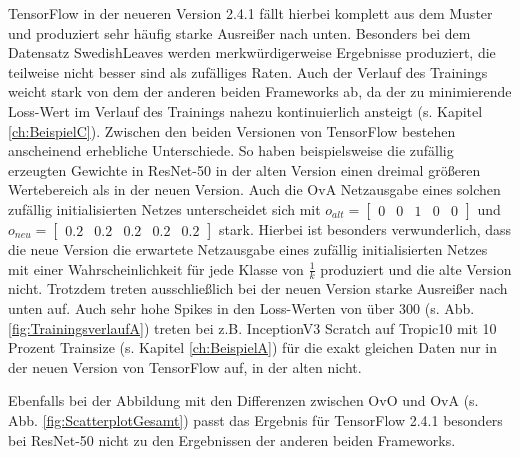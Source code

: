 TensorFlow \cite{tensorflow} in der neueren Version 2.4.1 fällt hierbei komplett aus dem Muster und produziert sehr häufig starke Ausreißer nach unten. Besonders bei dem Datensatz SwedishLeaves \cite{swedishLeaves} werden merkwürdigerweise Ergebnisse produziert, die teilweise nicht besser sind als zufälliges Raten. Auch der Verlauf des Trainings weicht stark von dem der anderen beiden Frameworks ab, da der zu minimierende Loss-Wert im Verlauf des Trainings nahezu kontinuierlich ansteigt (s. Kapitel \ref{ch:BeispielC}).
Zwischen den beiden Versionen von TensorFlow \cite{tensorflow} bestehen anscheinend erhebliche Unterschiede. So haben beispielsweise die zufällig erzeugten Gewichte in ResNet-50 in der alten Version einen dreimal größeren Wertebereich als in der neuen Version. Auch die OvA Netzausgabe eines solchen zufällig initialisierten Netzes unterscheidet sich mit $o_{alt}=\begin{bmatrix}
0 & 0 & 1 & 0 & 0
\end{bmatrix}$ und $o_{neu}=\begin{bmatrix}
0.2 & 0.2 & 0.2 & 0.2 & 0.2
\end{bmatrix}$ stark. Hierbei ist besonders verwunderlich, dass die neue Version die erwartete Netzausgabe eines zufällig initialisierten Netzes mit einer Wahrscheinlichkeit für jede Klasse von $\frac{1}{k}$ produziert und die alte Version nicht. Trotzdem treten ausschließlich bei der neuen Version starke Ausreißer nach unten auf. Auch sehr hohe Spikes in den Loss-Werten von über 300 (s. Abb. \ref{fig:TrainingsverlaufA}) treten bei z.B. InceptionV3 Scratch auf Tropic10 mit 10 Prozent Trainsize (s. Kapitel \ref{ch:BeispielA}) für die exakt gleichen Daten nur in der neuen Version von TensorFlow \cite{tensorflow} auf, in der alten nicht.


Ebenfalls bei der Abbildung mit den Differenzen zwischen OvO und OvA (s. Abb. \ref{fig:ScatterplotGesamt}) passt das Ergebnis für TensorFlow 2.4.1 \cite{tensorflow} besonders bei ResNet-50 nicht zu den Ergebnissen der anderen beiden Frameworks.\\


